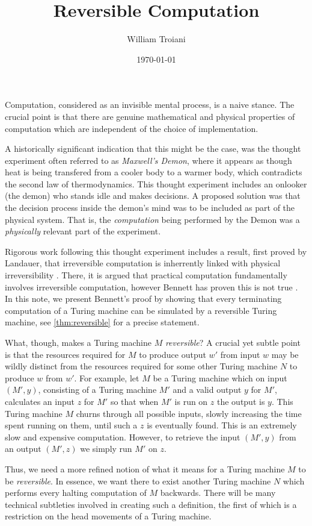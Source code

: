 \documentclass[12pt]{article}
\title{Reversible Computation}
\author{William Troiani}
\date{\today}
\theoremstyle{plain}
\theoremstyle{definition}
\begin{document}
	\maketitle
	
	Computation, considered as an invisible mental process, is a naive stance. The crucial point is that there are genuine mathematical and physical properties of computation which are independent of the choice of implementation.
	
	A historically significant indication that this might be the case, was the thought experiment often referred to as \emph{Maxwell's Demon}, where it appears as though heat is being transfered from a cooler body to a warmer body, which contradicts the second law of thermodynamics. This thought experiment includes an onlooker (the demon) who stands idle and makes decisions. A proposed solution was that the decision process inside the demon's mind was to be included as part of the physical system. That is, the \emph{computation} being performed by the Demon was a \emph{physically} relevant part of the experiment.
	
	Rigorous work following this thought experiment includes a result, first proved by Landauer, that irreversible computation is inherrently linked with physical irreversibility \cite{Landauer}. There, it is argued that practical computation fundamentally involves irreversible computation, however Bennett has proven this is not true \cite{Bennett}. In this note, we present Bennett's proof by showing that every terminating computation of a Turing machine can be simulated by a reversible Turing machine, see \ref{thm:reversible} for a precise statement.
	
	What, though, makes a Turing machine $M$ \emph{reversible}? A crucial yet subtle point is that the resources required for $M$ to produce output $w'$ from input $w$ may be wildly distinct from the resources required for some other Turing machine $N$ to produce $w$ from $w'$. For example, let $M$ be a Turing machine which on input $(M', y)$, consisting of a Turing machine $M'$ and a valid output $y$ for $M'$, calculates an input $z$ for $M'$ so that when $M'$ is run on $z$ the output is $y$. This Turing machine $M$ churns through all possible inputs, slowly increasing the time spent running on them, until such a $z$ is eventually found. This is an extremely slow and expensive computation. However, to retrieve the input $(M',y)$ from an output $(M',z)$ we simply run $M'$ on $z$.
	
	Thus, we need a more refined notion of what it means for a Turing machine $M$ to be \emph{reversible}. In essence, we want there to exist another Turing machine $N$ which performs every halting computation of $M$ backwards. There will be many technical subtleties involved in creating such a definition, the first of which is a restriction on the head movements of a Turing machine.
	
\end{document}
